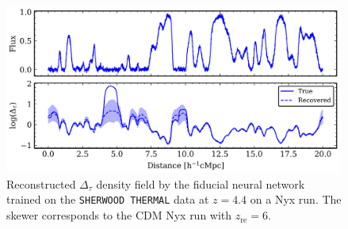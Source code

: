 \begin{figure}[h]
    \centering
    \includegraphics[width=0.99\textwidth]{img/ML/Nyx_skewer_rec.png}
    \caption{Reconstructed $\Delta_\tau$ density field by the fiducial neural network trained on the \texttt{SHERWOOD THERMAL} data at $z=4.4$ on a Nyx run. The skewer corresponds to the CDM Nyx run with $z_\mathrm{re}=6$.}
    \label{fig: nyx rec}
\end{figure}

